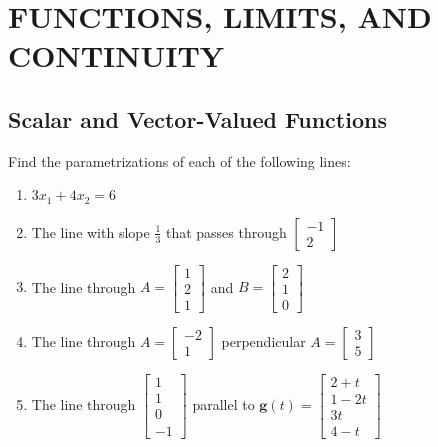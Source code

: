 \section{FUNCTIONS, LIMITS, AND CONTINUITY}

\subsection{Scalar and Vector-Valued Functions}

\begin{exercise} \label{e2.1.1}
    Find the parametrizations of each of the following lines:
    \begin{enumerate}
        \item \( 3x_1 + 4x_2 = 6 \)
        
        \item The line with slope \( \frac{1}{3} \) that passes through \( \begin{bmatrix} -1 \\ 2 \end{bmatrix} \)
        
        \item The line through \( A = \begin{bmatrix} 1 \\ 2 \\ 1 \end{bmatrix} \) and \( B = \begin{bmatrix} 2 \\ 1 \\ 0 \end{bmatrix}  \)
        
        \item The line through \( A = \begin{bmatrix} -2 \\ 1 \end{bmatrix} \) perpendicular \( A = \begin{bmatrix} 3 \\ 5 \end{bmatrix}  \)
        
        \item The line through \( \begin{bmatrix} 1 \\ 1 \\ 0 \\ -1 \end{bmatrix} \) parallel to \( \mathbf{g}(t) = \begin{bmatrix} 2+t \\ 1-2t \\ 3t \\ 4-t \end{bmatrix}  \)
    \end{enumerate}
    

\end{exercise}
